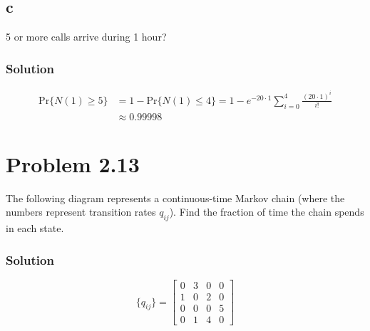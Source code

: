 \documentclass[letterpaper]{amsart}
\begin{document}
\subsection*{c}
5 or more calls arrive during 1 hour?
\subsubsection*{Solution}
\begin{equation*}
\begin{aligned}
\text{Pr}\{N(1)\geq 5\}&=
1 - \text{Pr}\{N(1)\leq 4\}=
1-e^{-20\cdot 1}\sum_{i=0}^4\frac{(20\cdot 1)^i}{i!} \\
&\approx 0.99998
\end{aligned}
\end{equation*}

\section{Problem 2.13} %
The following diagram represents a continuous-time Markov chain (where
the numbers represent transition rates $q_{ij}$). Find the fraction of time the
chain spends in each state.
\begin{figure}[!h]
\end{figure}

\subsubsection*{Solution}
\begin{equation*}
  \{q_{ij}\}=
\begin{bmatrix}
  0 & 3 & 0 & 0 \\
  1 & 0 & 2 & 0 \\
  0 & 0 & 0 & 5 \\
  0 & 1 & 4 & 0
\end{bmatrix}
\end{equation*}
\end{document}
